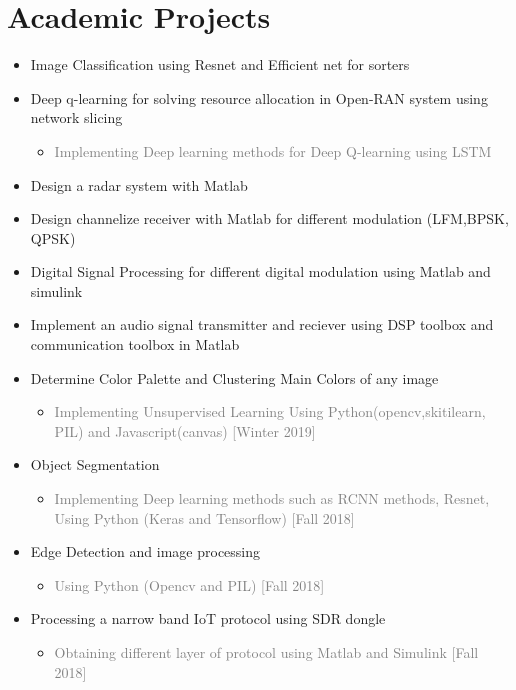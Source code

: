 \documentclass[10pt,a4paper,sans]{moderncv} %
\begin{document}


\section{Academic Projects}

\begin{itemize}
\item Image Classification using Resnet and Efficient net for sorters
\item Deep q-learning for solving resource allocation in Open-RAN system using network slicing
\begin{itemize}
\item \textcolor{gray}{Implementing Deep learning methods for Deep Q-learning using LSTM}
\end{itemize}
\item Design a radar system with Matlab 
\item Design channelize receiver with Matlab for different modulation (LFM,BPSK, QPSK)
\item Digital Signal Processing for different digital modulation using Matlab and simulink 
\item  Implement an audio signal transmitter and reciever using DSP toolbox and communication toolbox in Matlab 
\item Determine Color Palette and Clustering Main Colors of any image
\begin{itemize}
\item \textcolor{gray}{Implementing Unsupervised Learning Using Python(opencv,skitilearn, PIL) and Javascript(canvas) [Winter 2019]}
\end{itemize}
\item Object Segmentation 
\begin{itemize}
\item \textcolor{gray}{Implementing Deep learning methods such as RCNN methods, Resnet, Using Python (Keras and Tensorflow) [Fall 2018]}
\end{itemize}
\item Edge Detection and image processing
\begin{itemize}
\item \textcolor{gray}{Using Python (Opencv and PIL) [Fall 2018]}
\end{itemize}
\item Processing a narrow band IoT protocol using SDR dongle \begin{itemize}
\item \textcolor{gray}{Obtaining different layer of protocol using Matlab and Simulink [Fall 2018]}
\end{itemize}


\end{itemize}
\end{document}

